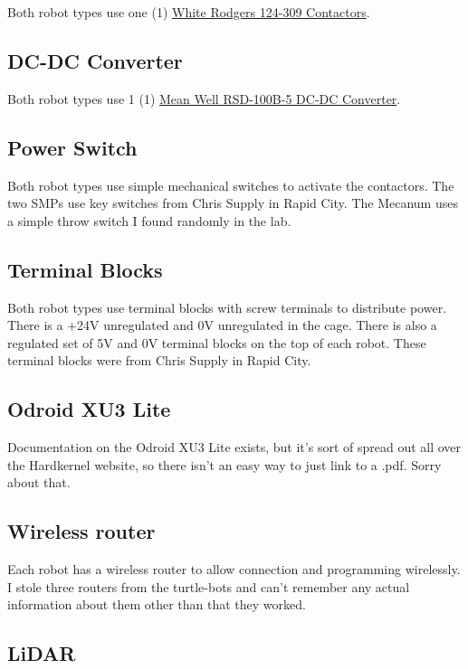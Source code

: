 Both robot types use one (1) \href{run:contactor.pdf}{White Rodgers 124-309 Contactors}.

\subsection{DC-DC Converter}

Both robot types use 1 (1) \href{run:Mean_Well-RSD-100B-5-datasheet.pdf}{Mean Well RSD-100B-5 DC-DC Converter}.

\subsection{Power Switch}

Both robot types use simple mechanical switches to activate the contactors. The two SMPs use key switches from Chris Supply in Rapid City. The Mecanum uses a simple throw switch I found randomly in the lab.

\subsection{Terminal Blocks}

Both robot types use terminal blocks with screw terminals to distribute power. There is a +24V unregulated and 0V unregulated in the cage. There is also a regulated set of 5V and 0V terminal blocks on the top of each robot. These terminal blocks were from Chris Supply in Rapid City.

\subsection{Odroid XU3 Lite}

Documentation on the Odroid XU3 Lite exists, but it's sort of spread out all over the Hardkernel website, so there isn't an easy way to just link to a .pdf. Sorry about that.

\subsection{Wireless router}
Each robot has a wireless router to allow connection and programming wirelessly. I stole three routers from the turtle-bots and can't remember any actual information about them other than that they worked.

\subsection{LiDAR}

